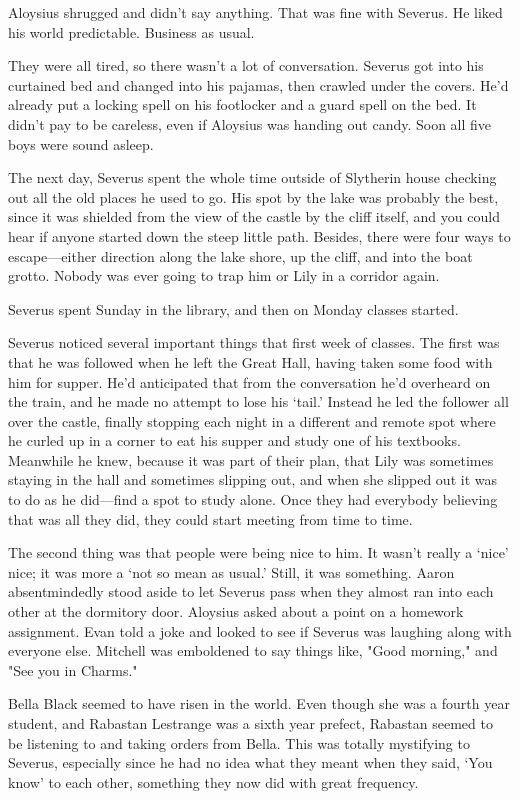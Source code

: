 Aloysius shrugged and didn't say anything. That was fine with Severus. He liked his world predictable. Business as usual.

They were all tired, so there wasn't a lot of conversation. Severus got into his curtained bed and changed into his pajamas, then crawled under the covers. He'd already put a locking spell on his footlocker and a guard spell on the bed. It didn't pay to be careless, even if Aloysius was handing out candy. Soon all five boys were sound asleep.

The next day, Severus spent the whole time outside of Slytherin house checking out all the old places he used to go. His spot by the lake was probably the best, since it was shielded from the view of the castle by the cliff itself, and you could hear if anyone started down the steep little path. Besides, there were four ways to escape—either direction along the lake shore, up the cliff, and into the boat grotto. Nobody was ever going to trap him or Lily in a corridor again.

Severus spent Sunday in the library, and then on Monday classes started.

Severus noticed several important things that first week of classes. The first was that he was followed when he left the Great Hall, having taken some food with him for supper. He'd anticipated that from the conversation he'd overheard on the train, and he made no attempt to lose his `tail.' Instead he led the follower all over the castle, finally stopping each night in a different and remote spot where he curled up in a corner to eat his supper and study one of his textbooks. Meanwhile he knew, because it was part of their plan, that Lily was sometimes staying in the hall and sometimes slipping out, and when she slipped out it was to do as he did—find a spot to study alone. Once they had everybody believing that was all they did, they could start meeting from time to time.

The second thing was that people were being nice to him. It wasn't really a `nice' nice; it was more a `not so mean as usual.' Still, it was something. Aaron absentmindedly stood aside to let Severus pass when they almost ran into each other at the dormitory door. Aloysius asked about a point on a homework assignment. Evan told a joke and looked to see if Severus was laughing along with everyone else. Mitchell was emboldened to say things like, "Good morning," and "See you in Charms."

Bella Black seemed to have risen in the world. Even though she was a fourth year student, and Rabastan Lestrange was a sixth year prefect, Rabastan seemed to be listening to and taking orders from Bella. This was totally mystifying to Severus, especially since he had no idea what they meant when they said, `You know{\el}' to each other, something they now did with great frequency.

